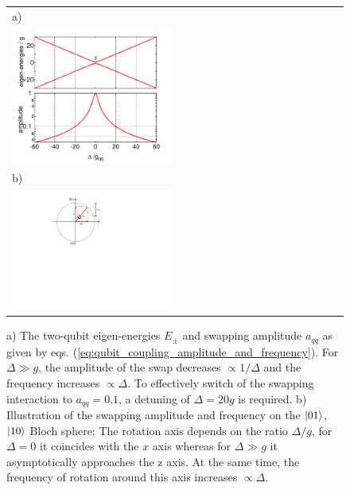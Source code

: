 \begin{figure}
	\centering
	\begin{tabular}{l}
	a) \\ \includegraphics[width=0.49\textwidth]{./material/mathematica/qubit_qubit_coupling} \\
	b) \\ \includegraphics[width=0.49\textwidth]{./material/figures/introduction/bloch_sphere_coupling_illustration}
	\end{tabular}
	\caption[]{a) The two-qubit eigen-energies $E_\pm$ and swapping amplitude $a_{qq}$ as given by eqs. (\ref{eq:qubit_coupling_amplitude_and_frequency}). For $\Delta \gg g$, the amplitude of the swap decreases $\propto 1/\Delta$ and the frequency increases $\propto \Delta$. To effectively switch of the swapping interaction to $a_{qq}=0.1$, a detuning of $\Delta = 20 g$ is required. b) Illustration of the swapping amplitude and frequency on the $\left| 01 \right>$,$\left| 10 \right>$ Bloch sphere: The rotation axis depends on the ratio $\Delta/g$, for $\Delta=0$ it coincides with the $x$ axis whereas for $\Delta \gg g$ it asymptotically approaches the z axis. At the same time, the frequency of rotation around this axis increases $\propto \Delta$. }
	\label{fig:qubit_coupling_amplitude_and_frequency}
\end{figure}

